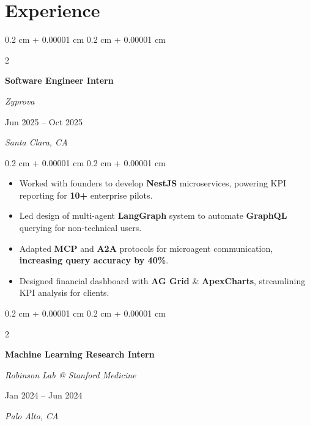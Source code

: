 \documentclass[10pt, letterpaper]{article}
\newenvironment{highlights}{
    \begin{itemize}[
        topsep=0.10 cm,
        parsep=0.10 cm,
        partopsep=0pt,
        itemsep=0pt,
        leftmargin=0.4 cm + 10pt
    ]
}{
    \end{itemize}
} %
\newenvironment{onecolentry}{
    \begin{adjustwidth}{
        0.2 cm + 0.00001 cm
    }{
        0.2 cm + 0.00001 cm
    }
}{
    \end{adjustwidth}
} %
\newenvironment{twocolentry}[2][]{
    \onecolentry
    \def\secondColumn{#2}
    \setcolumnwidth{\fill, 5 cm}
    \begin{paracol}{2}
}{
    \switchcolumn \raggedleft \secondColumn
    \end{paracol}
    \endonecolentry
} %
\let\hrefWithoutArrow\href
\renewcommand{\href}[2]{\hrefWithoutArrow{#1}{\ifthenelse{\equal{#2}{}}{ }{#2 }\raisebox{.15ex}{\footnotesize \faExternalLink*}}}
\begin{document}
    
    \section{Experience}



        
        \begin{twocolentry}{
        Jun 2025 – Oct 2025 
            
        \textit{Santa Clara, CA}}
            \textbf{Software Engineer Intern}
            
            \textit{Zyprova}
        \end{twocolentry}

        \vspace{0.10 cm}
        \begin{onecolentry}
            \begin{highlights}
                \item Worked with founders to develop \textbf{NestJS} microservices, powering KPI reporting for \textbf{10+} enterprise pilots.
                \item Led design of multi-agent \textbf{LangGraph} system to automate \textbf{GraphQL} querying for non-technical users.
                \item Adapted \textbf{MCP} and \textbf{A2A} protocols for microagent communication, \textbf{increasing query accuracy by 40\%}.
                \item Designed financial dashboard with \textbf{AG Grid} \& \textbf{ApexCharts}, streamlining KPI analysis for clients.
            \end{highlights}
        \end{onecolentry}


        \vspace{0.3 cm}

        \begin{twocolentry}{
        Jan 2024 – Jun 2024    
            
        \textit{Palo Alto, CA}}
            \textbf{Machine Learning Research Intern}
            
            \textit{Robinson Lab @ Stanford Medicine}
        \end{twocolentry}
\end{document}
